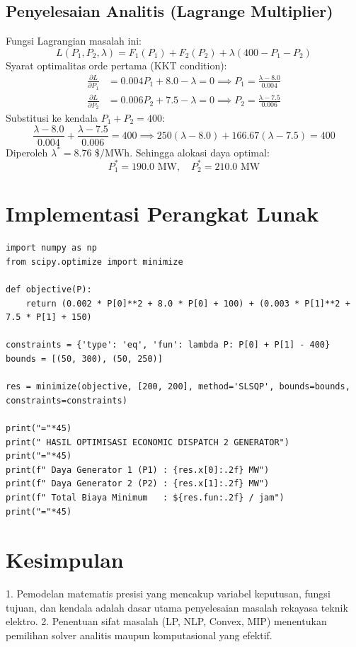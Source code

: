 \documentclass[11pt,a4paper]{article}
\begin{document}
\subsection{Penyelesaian Analitis (Lagrange Multiplier)}
Fungsi Lagrangian masalah ini:
\begin{equation}
    L(P_1, P_2, \lambda) = F_1(P_1) + F_2(P_2) + \lambda (400 - P_1 - P_2)
\end{equation}
Syarat optimalitas orde pertama (KKT condition):
\begin{align}
    \frac{\partial L}{\partial P_1} &= 0.004 P_1 + 8.0 - \lambda = 0 \implies P_1 = \frac{\lambda - 8.0}{0.004} \\
    \frac{\partial L}{\partial P_2} &= 0.006 P_2 + 7.5 - \lambda = 0 \implies P_2 = \frac{\lambda - 7.5}{0.006}
\end{align}
Substitusi ke kendala $P_1 + P_2 = 400$:
\begin{equation}
    \frac{\lambda - 8.0}{0.004} + \frac{\lambda - 7.5}{0.006} = 400 \implies 250(\lambda - 8.0) + 166.67(\lambda - 7.5) = 400
\end{equation}
Diperoleh $\lambda^* = 8.76\text{ \$/MWh}$.
Sehingga alokasi daya optimal:
\begin{equation}
    P_1^* = 190.0\text{ MW}, \quad P_2^* = 210.0\text{ MW}
\end{equation}

\section{Implementasi Perangkat Lunak}

\begin{lstlisting}[caption={Skrip Python Pengantar Optimisasi SciPy}]
import numpy as np
from scipy.optimize import minimize

def objective(P):
    return (0.002 * P[0]**2 + 8.0 * P[0] + 100) + (0.003 * P[1]**2 + 7.5 * P[1] + 150)

constraints = {'type': 'eq', 'fun': lambda P: P[0] + P[1] - 400}
bounds = [(50, 300), (50, 250)]

res = minimize(objective, [200, 200], method='SLSQP', bounds=bounds, constraints=constraints)

print("="*45)
print(" HASIL OPTIMISASI ECONOMIC DISPATCH 2 GENERATOR")
print("="*45)
print(f" Daya Generator 1 (P1) : {res.x[0]:.2f} MW")
print(f" Daya Generator 2 (P2) : {res.x[1]:.2f} MW")
print(f" Total Biaya Minimum   : ${res.fun:.2f} / jam")
print("="*45)
\end{lstlisting}

\section{Kesimpulan}
1. Pemodelan matematis presisi yang mencakup variabel keputusan, fungsi tujuan, dan kendala adalah dasar utama penyelesaian masalah rekayasa teknik elektro.
2. Penentuan sifat masalah (LP, NLP, Convex, MIP) menentukan pemilihan solver analitis maupun komputasional yang efektif.
\end{document}
